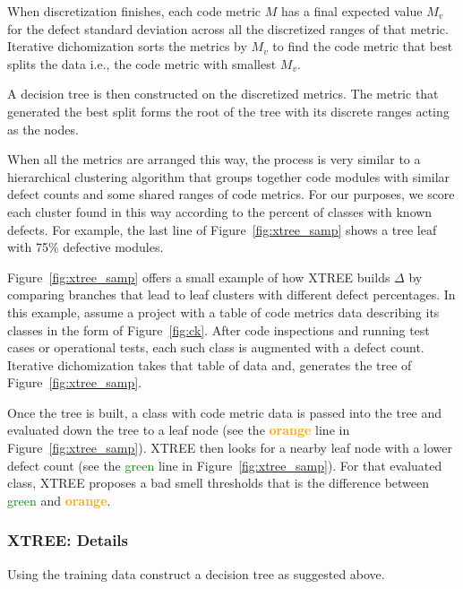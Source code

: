 \documentclass[twocolumn,5p]{elsarticle}
\newcommand{\fig}[1]{Figure~\ref{fig:#1}}
\theoremstyle{break}
\begin{document}
	When discretization finishes, each code metric $M$ has a 
	final expected value $M_v$ for the defect standard deviation 
	across all the discretized ranges of that metric.
	Iterative dichomization sorts the metrics by $M_v$
	to find the code metric that best splits the data i.e., the code metric with smallest $M_v$. 
	
	A decision tree is then constructed on the discretized metrics. The metric that generated the best split forms the root of the tree with its discrete ranges acting as the nodes. 
	
	When all the metrics are arranged this way, the process is very similar to a hierarchical clustering algorithm that groups together code modules with similar defect counts and some shared ranges of code metrics.
	For our purposes, we score each cluster found in this way according
	to the percent of classes with known defects. For example, the last line of \fig{xtree_samp} shows a tree leaf with 75\%
	defective modules.
	
	\fig{xtree_samp} offers
	a small example of how XTREE builds
	$\Delta$ by comparing branches that lead to leaf clusters
	with different defect percentages. In this example, assume a project with a table of code metrics data describing its classes in the form of \fig{ck}. After code inspections and running test cases or operational
	tests, each such class is augmented with a defect count.
	Iterative dichomization takes that table of data and, 
	generates the tree of \fig{xtree_samp}.
	
	Once the tree is built, a class with code metric data is passed into the tree and evaluated down the tree to a leaf node (see the \textcolor{orange}{{\bf orange}} line in \fig{xtree_samp}).
	XTREE then looks for a nearby leaf node with a lower defect
	count (see the \textcolor{green}{{green}} line in \fig{xtree_samp}). For that evaluated class, XTREE proposes a bad smell
	thresholds that is  the difference between 
	\textcolor{green}{{green}} and \textcolor{orange}{{\bf orange}}. 
	
	
	\subsubsection{XTREE:   Details}
	
	Using the training data construct a decision tree as suggested above.
	
	
\end{document}
